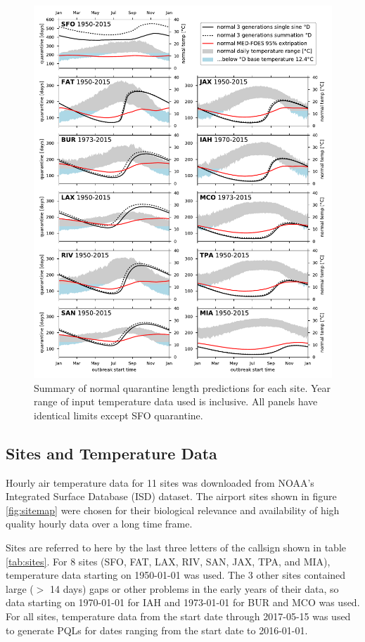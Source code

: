 \documentclass[10pt,a4paper,twocolumn]{article}
\begin{document}
\begin{figure}[ht!] %
\centering
\includegraphics[width=1\textwidth]{figs/fig_main.pdf}
\caption{\label{fig:main_summary}Summary of normal quarantine length predictions for each site.
Year range of input temperature data used is inclusive.
All panels have identical limits except SFO quarantine.}
\end{figure}



\subsection*{Sites and Temperature Data}
Hourly air temperature data for 11 sites was downloaded from 
NOAA's Integrated Surface Database (ISD) dataset\cite{smith_integrated_2011,NOAA_ISD_portal}.
The airport sites shown in figure \ref{fig:sitemap} 
were chosen for their biological relevance and 
availability of high quality hourly data over a long time frame.

Sites are referred to here by the last three letters of the callsign shown in table \ref{tab:sites}.
For 8 sites (SFO, FAT, LAX, RIV, SAN, JAX, TPA, and MIA), temperature data starting on 1950-01-01 was used.
The 3 other sites contained large ($>$ 14 days) gaps or other problems in the early years of their data,
so data starting on 1970-01-01 for IAH and 1973-01-01 for BUR and MCO was used.
For all sites, temperature data from the start date through 2017-05-15 was used
to generate PQLs for dates ranging from the start date to 2016-01-01.
\end{document}
